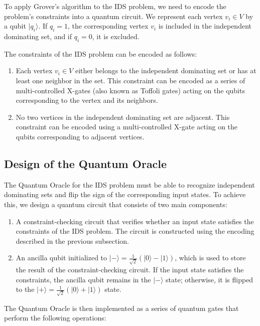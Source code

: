 To apply Grover's algorithm to the IDS problem, we need to encode the problem's constraints into a quantum circuit. We represent each vertex $v_i \in V$ by a qubit $|q_i\rangle$. If $q_i = 1$, the corresponding vertex $v_i$ is included in the independent dominating set, and if $q_i = 0$, it is excluded.

The constraints of the IDS problem can be encoded as follows:

\begin{enumerate}
    \item Each vertex $v_i \in V$ either belongs to the independent dominating set or has at least one neighbor in the set. This constraint can be encoded as a series of multi-controlled X-gates (also known as Toffoli gates) acting on the qubits corresponding to the vertex and its neighbors.
    \item No two vertices in the independent dominating set are adjacent. This constraint can be encoded using a multi-controlled X-gate acting on the qubits corresponding to adjacent vertices.
\end{enumerate}

\subsection{Design of the Quantum Oracle}

The Quantum Oracle for the IDS problem must be able to recognize independent dominating sets and flip the sign of the corresponding input states. To achieve this, we design a quantum circuit that consists of two main components:

\begin{enumerate}
    \item A constraint-checking circuit that verifies whether an input state satisfies the constraints of the IDS problem. The circuit is constructed using the encoding described in the previous subsection.
    \item An ancilla qubit initialized to $|-\rangle = \frac{1}{\sqrt{2}}(|0\rangle - |1\rangle)$, which is used to store the result of the constraint-checking circuit. If the input state satisfies the constraints, the ancilla qubit remains in the $|-\rangle$ state; otherwise, it is flipped to the $|+\rangle = \frac{1}{\sqrt{2}}(|0\rangle + |1\rangle)$ state.
\end{enumerate}

The Quantum Oracle is then implemented as a series of quantum gates that perform the following operations:

